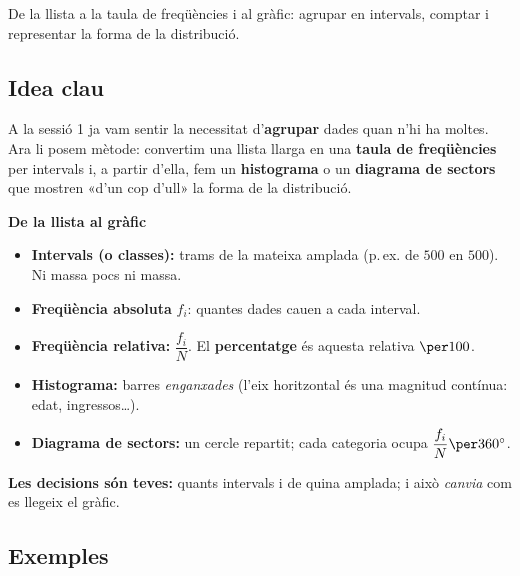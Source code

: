 %
{De la llista a la taula de freqüències i al gràfic: agrupar en intervals, comptar i representar la forma de la distribució.}

\subsection{Idea clau}

A la sessió 1 ja vam sentir la necessitat d'\textbf{agrupar} dades quan n'hi ha
moltes. Ara li posem mètode: convertim una llista llarga en una \textbf{taula de
freqüències} per intervals i, a partir d'ella, fem un \textbf{histograma} o un
\textbf{diagrama de sectors} que mostren «d'un cop d'ull» la forma de la distribució.

\begin{idea}
\textbf{De la llista al gràfic}
\begin{itemize}[leftmargin=1.4em, itemsep=2pt]
  \item \textbf{Intervals (o classes):} trams de la mateixa amplada (p.\,ex. de
        $500$ en $500$). Ni massa pocs ni massa.
  \item \textbf{Freqüència absoluta} $f_i$: quantes dades cauen a cada interval.
  \item \textbf{Freqüència relativa:} $\dfrac{f_i}{N}$. El \textbf{percentatge} és
        aquesta relativa $\per 100$.
  \item \textbf{Histograma:} barres \emph{enganxades} (l'eix horitzontal és una
        magnitud contínua: edat, ingressos\dots).
  \item \textbf{Diagrama de sectors:} un cercle repartit; cada categoria ocupa
        $\dfrac{f_i}{N}\per 360^\circ$.
\end{itemize}
\textbf{Les decisions són teves:} quants intervals i de quina amplada; i això
\emph{canvia} com es llegeix el gràfic.
\end{idea}

\subsection{Exemples}

